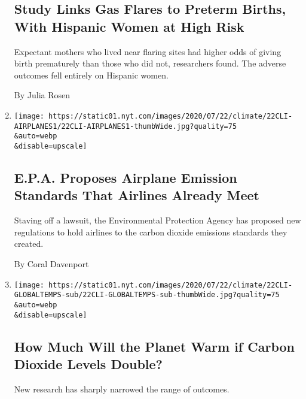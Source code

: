 \begin{enumerate}
  \hypertarget{study-links-gas-flares-to-preterm-births-with-hispanic-women-at-high-risk}{%
  \subsection{Study Links Gas Flares to Preterm Births, With Hispanic
  Women at High
  Risk}\label{study-links-gas-flares-to-preterm-births-with-hispanic-women-at-high-risk}}

  Expectant mothers who lived near flaring sites had higher odds of
  giving birth prematurely than those who did not, researchers found.
  The adverse outcomes fell entirely on Hispanic women.

  By Julia Rosen
\item
  \href{/2020/07/22/climate/airplanes-climate-change.html}{}

  \texttt{[image: https://static01.nyt.com/images/2020/07/22/climate/22CLI-AIRPLANES1/22CLI-AIRPLANES1-thumbWide.jpg?quality=75\\\&auto=webp\\\&disable=upscale]}

  \hypertarget{epa-proposes-airplane-emission-standards-that-airlines-already-meet}{%
  \subsection{E.P.A. Proposes Airplane Emission Standards That Airlines
  Already
  Meet}\label{epa-proposes-airplane-emission-standards-that-airlines-already-meet}}

  Staving off a lawsuit, the Environmental Protection Agency has
  proposed new regulations to hold airlines to the carbon dioxide
  emissions standards they created.

  By Coral Davenport
\item
  \href{/2020/07/22/climate/global-warming-temperature-range.html}{}

  \texttt{[image: https://static01.nyt.com/images/2020/07/22/climate/22CLI-GLOBALTEMPS-sub/22CLI-GLOBALTEMPS-sub-thumbWide.jpg?quality=75\\\&auto=webp\\\&disable=upscale]}

  \hypertarget{how-much-will-the-planet-warm-if-carbon-dioxide-levels-double}{%
  \subsection{How Much Will the Planet Warm if Carbon Dioxide Levels
  Double?}\label{how-much-will-the-planet-warm-if-carbon-dioxide-levels-double}}

  New research has sharply narrowed the range of outcomes.


\end{enumerate}
